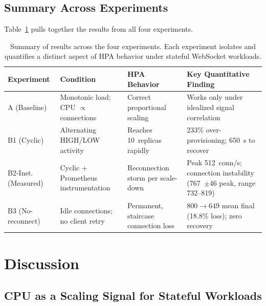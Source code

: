\documentclass[pdflatex,sn-mathphys-num]{sn-jnl}
\theoremstyle{thmstyleone}%
\theoremstyle{thmstyletwo}%
\theoremstyle{thmstylethree}%
\begin{document}
\subsection{Summary Across Experiments}

Table~\ref{tab:failure_summary} pulls together the results from all four
experiments.

\begin{table}[htbp]
\centering
\caption{Summary of results across the four experiments. Each experiment isolates
and quantifies a distinct aspect of HPA behavior under stateful WebSocket workloads.}
\label{tab:failure_summary}
\begin{tabular}{@{}p{2.2cm}p{3.5cm}p{3.5cm}p{5cm}@{}}
\toprule
\rowcolor{gray!12}
\textbf{Experiment} & \textbf{Condition} & \textbf{HPA Behavior} & \textbf{Key Quantitative Finding} \\
\midrule
A (Baseline) & Monotonic load; CPU $\propto$ connections & Correct proportional scaling & Works only under idealized signal correlation \\
B1 (Cyclic) & Alternating HIGH/LOW activity & Reaches 10~replicas rapidly & 233\% over-provisioning; 650~s to recover \\
B2-Inst. (Measured) & Cyclic + Prometheus instrumentation & Reconnection storm per scale-down & Peak 512~conn/s; connection instability (767~$\pm$46 peak, range 732--819) \\
B3 (No-reconnect) & Idle connections; no client retry & Permanent, staircase connection loss & $800{\rightarrow}649$ mean final (18.8\% loss); zero recovery \\
\bottomrule
\end{tabular}
\end{table}


\section{Discussion}
\label{sec:discussion}

\subsection{CPU as a Scaling Signal for Stateful Workloads}
\label{sec:signal_mismatch}
\end{document}
